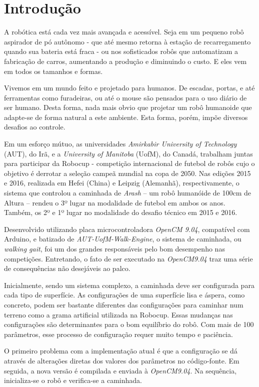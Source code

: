\chapter{Introdução}

A robótica está cada vez mais avançada e acessível. Seja em um pequeno robô aspirador de pó autônomo - que até mesmo retorna à estação de recarregamento quando sua bateria está fraca - ou nos sofisticados robôs que automatizam a fabricação de carros, aumentando a produção e diminuindo o custo. E eles vem em todos os tamanhos e formas.

Vivemos em um mundo feito e projetado para humanos. De escadas, portas, e até ferramentas como furadeiras, ou até o mouse são pensados para o uso diário de ser humano. Desta forma, nada mais obvio que projetar um robô humanoide que adapte-se de forma natural a este ambiente. Esta forma, porém, impõe diversos desafios ao controle.

Em um esforço mútuo, as universidades \textit{Amirkabir University of Technology} (AUT), do Irã, e a \textit{University of Manitoba} (UofM), do Canadá, trabalham juntas para participar da Robocup - competição internacional de futebol de robôs cujo o objetivo é derrotar a seleção campeã mundial na copa de 2050. Nas edições 2015 e 2016, realizada em Hefei (China) e Leipzig (Alemanhã), respectivamente, o sistema que controlou a caminhada de \textit{Arash} -- um robô humanóide de 100cm de Altura -- rendeu o 3º lugar na modalidade de futebol em ambos os anos. Também, os 2º e 1º lugar no modalidade do desafio técnico em 2015 e 2016.

Desenvolvido utilizando placa microcontroladora \textit{OpenCM 9.04}, compatível com Arduino, e batizado de \textit{AUT-UofM-Walk-Engine}, o sistema de caminhada, ou \textit{walking gait}, foi um dos grandes responsáveis pelo bom desempenho nas competições. Entretando, o fato de ser executado na \textit{OpenCM9.04} traz uma série de consequências não desejáveis ao palco.

Inicialmente, sendo um sistema complexo, a caminhada deve ser configurada para cada tipo de superfície. As configurações de uma superfície lisa e áspera, como concreto, podem ser bastante diferentes das configurações para caminhar num terreno como a grama artificial utilizada na Robocup. Essas mudanças nas configurações são determinantes para o bom equilíbrio do robô. Com mais de 100 parâmetros, esse processo de configuração requer muito tempo e paciência.

O primeiro problema com a implementação atual é que a configuração se dá através de alterações diretas dos valores dos parâmetros no código-fonte. Em seguida, a nova versão é compilada e enviada à \textit{OpenCM9.04}. Na sequência, inicializa-se o robô e verifica-se a caminhada.

